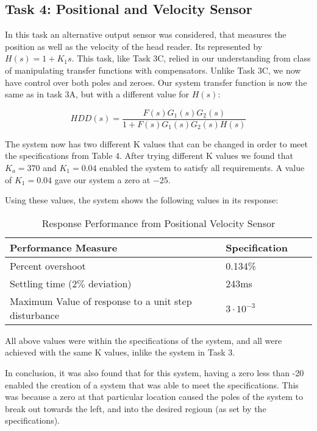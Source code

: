 \documentclass{article}
\begin{document}
\subsection*{Task 4: Positional and Velocity Sensor}

In this task an alternative output sensor was considered, that measures the
position as well as the velocity of the head reader. Its represented by $H(s)
= 1 + K_1s$. This task, like Task 3C, relied in our understanding from class of
manipulating transfer functions with compensators. Unlike Task 3C, we now have
control over both poles and zeroes. Our system transfer function is now the 
same as in task 3A, but with a different value for $H(s)$:

$$HDD(s) = \frac{F(s)G_1(s)G_2(s)}{1 + F(s)G_1(s)G_2(s)H(s)}$$

The system now has two different K values that can be changed in order to meet
the specifications from Table 4. After trying different K values we found that
$K_a = 370$ and $K_1 = 0.04$ enabled the system to satisfy all requirements.
A value of $K_1 = 0.04$ gave our system a zero at $-25$.

Using these values, the system shows the following values in its response:

\begin{table}[H]
\begin{center}
  \begin{tabular}{ | l | l | l | p{5cm} |}
  \hline
  \textbf{Performance Measure} & \textbf{Specification}\\ \hline
  Percent overshoot & 0.134\% \\ \hline
  Settling time ($2\%$ deviation) & 243ms \\ \hline
  Maximum Value of response to a unit step disturbance & $3\cdot10^{-3}$\\ \hline 
 \end{tabular}
\end{center}
\caption{Response Performance from Positional Velocity Sensor}
\end{table}

All above values were within the specifications of the system, and all were
achieved with the same K values, inlike the system in Task 3.


In conclusion, it was also found that for this system, having a zero less than
-20 enabled the creation of a system that was able to meet the specifications.
This was because a zero at that particular location caused the poles of the
system to break out towards the left, and into the desired regioun (as set by
the specifications).
\end{document}
